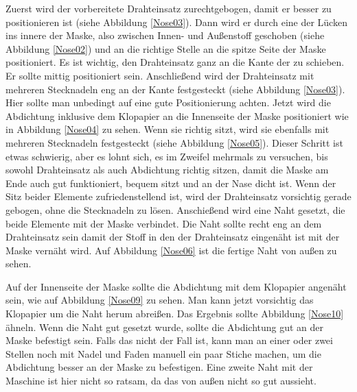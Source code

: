 \documentclass[12pt,parskip=full]{scrartcl}
\begin{document}
Zuerst wird der vorbereitete Drahteinsatz zurechtgebogen, damit er besser zu positionieren ist (siehe Abbildung \ref{Nose03}). Dann wird er durch eine der Lücken ins innere der Maske, also zwischen Innen- und Außenstoff geschoben (siehe Abbildung \ref{Nose02}) und an die richtige Stelle an die spitze Seite der Maske positioniert. Es ist wichtig, den Drahteinsatz ganz an die Kante der zu schieben. Er sollte mittig positioniert sein. Anschließend wird der Drahteinsatz mit mehreren Stecknadeln eng an der Kante festgesteckt (siehe Abbildung \ref{Nose03}). Hier sollte man unbedingt auf eine gute Positionierung achten. Jetzt wird die Abdichtung inklusive dem Klopapier an die Innenseite der Maske positioniert wie in Abbildung \ref{Nose04} zu sehen. Wenn sie richtig sitzt, wird sie ebenfalls mit mehreren Stecknadeln festgesteckt (siehe Abbildung \ref{Nose05}). Dieser Schritt ist etwas schwierig, aber es lohnt sich, es im Zweifel mehrmals zu versuchen, bis sowohl Drahteinsatz als auch Abdichtung richtig sitzen, damit die Maske am Ende auch gut funktioniert, bequem sitzt und an der Nase dicht ist. Wenn der Sitz beider Elemente zufriedenstellend ist, wird der Drahteinsatz vorsichtig gerade gebogen, ohne die Stecknadeln zu lösen. Anschießend wird eine Naht gesetzt, die beide Elemente mit der Maske verbindet. Die Naht sollte recht eng an dem Drahteinsatz sein damit der Stoff in den der Drahteinsatz eingenäht ist mit der Maske vernäht wird. Auf Abbildung \ref{Nose06} ist die fertige Naht von außen zu sehen.\par

Auf der Innenseite der Maske sollte die Abdichtung mit dem Klopapier angenäht sein, wie auf Abbildung \ref{Nose09} zu sehen. Man kann jetzt vorsichtig das Klopapier um die Naht herum abreißen. Das Ergebnis sollte Abbildung \ref{Nose10} ähneln. Wenn die Naht gut gesetzt wurde, sollte die Abdichtung gut an der Maske befestigt sein. Falls das nicht der Fall ist, kann man an einer oder zwei Stellen noch mit Nadel und Faden manuell ein paar Stiche machen, um die Abdichtung besser an der Maske zu befestigen. Eine zweite Naht mit der Maschine ist hier nicht so ratsam, da das von außen nicht so gut aussieht. 
\end{document}
